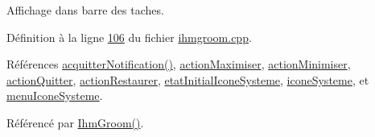 Affichage dans barre des taches. 

Définition à la ligne \hyperlink{ihmgroom_8cpp_source_l00106}{106} du fichier \hyperlink{ihmgroom_8cpp_source}{ihmgroom.\+cpp}.



Références \hyperlink{ihmgroom_8cpp_source_l00170}{acquitter\+Notification()}, \hyperlink{ihmgroom_8h_source_l00096}{action\+Maximiser}, \hyperlink{ihmgroom_8h_source_l00095}{action\+Minimiser}, \hyperlink{ihmgroom_8h_source_l00098}{action\+Quitter}, \hyperlink{ihmgroom_8h_source_l00097}{action\+Restaurer}, \hyperlink{ihmgroom_8h_source_l00099}{etat\+Initial\+Icone\+Systeme}, \hyperlink{ihmgroom_8h_source_l00093}{icone\+Systeme}, et \hyperlink{ihmgroom_8h_source_l00094}{menu\+Icone\+Systeme}.



Référencé par \hyperlink{ihmgroom_8cpp_source_l00031}{Ihm\+Groom()}.


